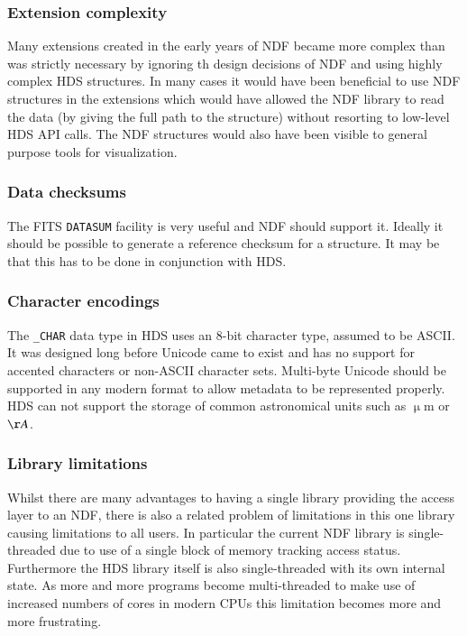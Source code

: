 \documentclass[final,authoryear,5p,times,twocolumn]{elsarticle}
\begin{document}
\subsubsection{Extension complexity}

Many extensions created in the early years of NDF became more complex
than was strictly necessary by ignoring th design decisions of NDF and
using highly complex HDS structures. In many cases it would have been
beneficial to use NDF structures in the extensions which would have
allowed the NDF library to read the data (by giving the full path to
the structure) without resorting to low-level HDS API calls. The NDF
structures would also have been visible to general purpose tools for
visualization.

\subsubsection{Data checksums}

The FITS \texttt{DATASUM} facility is very useful and NDF should support
it. Ideally it should be possible to generate a reference checksum for
a structure. It may be that this has to be done in conjunction with
HDS.

\subsubsection{Character encodings}

The \texttt{\_CHAR} data type in HDS uses an 8-bit character type,
assumed to be ASCII. It was designed long before Unicode came to exist
and has no support for accented characters or non-ASCII character
sets. Multi-byte Unicode should be supported in any modern format to
allow metadata to be represented properly. HDS can not support the
storage of common astronomical units such as $\upmu$m or $\AA$.

\subsubsection{Library limitations}

Whilst there are many advantages to having a single library
providing the access layer to an NDF, there is also a related problem
of limitations in this one library causing limitations to all
users. In particular the current NDF library is single-threaded due to
use of a single block of memory tracking access status. Furthermore
the HDS library itself is also single-threaded with its own internal
state. As more and more programs become multi-threaded to make use of
increased numbers of cores in modern CPUs this limitation becomes more
and more frustrating.
\end{document}
